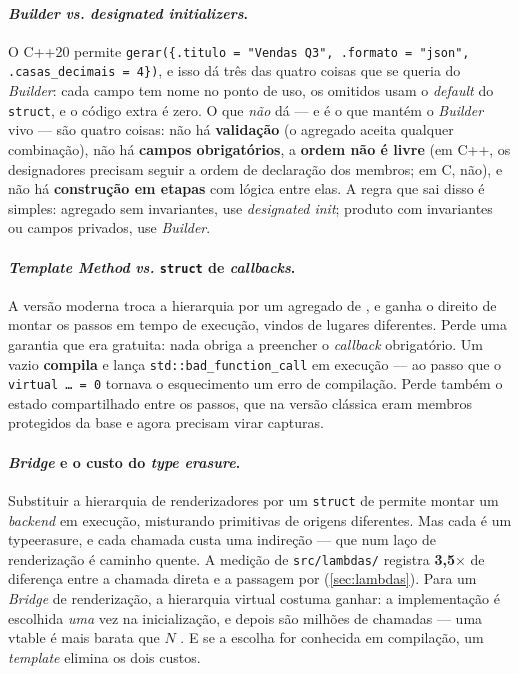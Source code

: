 \paragraph{\emph{Builder} \emph{vs.} \emph{designated initializers}.} O C++20
permite \texttt{gerar(\{.titulo = "Vendas Q3", .formato = "json",
.casas\_decimais = 4\})}, e isso dá três das quatro coisas que se queria do
\emph{Builder}: cada campo tem nome no ponto de uso, os omitidos usam o
\emph{default} do \texttt{struct}, e o código extra é zero. O que \emph{não} dá
--- e é o que mantém o \emph{Builder} vivo --- são quatro coisas: não há
\textbf{validação} (o agregado aceita qualquer combinação), não há
\textbf{campos obrigatórios}, a \textbf{ordem não é livre} (em C++, os
designadores precisam seguir a ordem de declaração dos membros; em C, não), e
não há \textbf{construção em etapas} com lógica entre elas. A regra que sai
disso é simples: agregado sem invariantes, use \emph{designated init}; produto
com invariantes ou campos privados, use \emph{Builder}.

\paragraph{\emph{Template Method} \emph{vs.} \texttt{struct} de \emph{callbacks}.}
A versão moderna troca a hierarquia por um agregado de ,
e ganha o direito de montar os passos em tempo de execução, vindos de lugares
diferentes. Perde uma garantia que era gratuita: nada obriga a preencher o
\emph{callback} obrigatório. Um  vazio \textbf{compila} e
lança \texttt{std::bad\_function\_call} em execução --- ao passo que o
\texttt{virtual \ldots{} = 0} tornava o esquecimento um erro de compilação.
Perde também o estado compartilhado entre os passos, que na versão clássica eram
membros protegidos da base e agora precisam virar capturas.

\paragraph{\emph{Bridge} e o custo do \emph{type erasure}.} Substituir a
hierarquia de renderizadores por um \texttt{struct} de 
permite montar um \emph{backend} em execução, misturando primitivas de origens
diferentes. Mas cada  é um \gls{typeerasure}, e cada
chamada custa uma indireção --- que num laço de renderização é caminho quente. A
medição de \texttt{src/lambdas/} registra \textbf{3,5$\times$} de diferença
entre a chamada direta e a passagem por 
(\cref{sec:lambdas}). Para um \emph{Bridge} de renderização, a hierarquia
virtual costuma ganhar: a implementação é escolhida \emph{uma} vez na
inicialização, e depois são milhões de chamadas --- uma \gls{vtable} é mais
barata que $N$ . E se a escolha for conhecida em
compilação, um \emph{template} elimina os dois custos.

